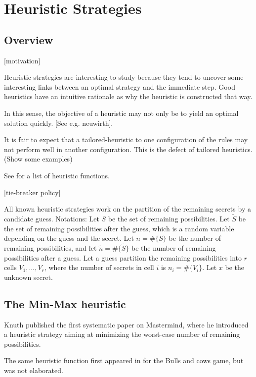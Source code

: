 \chapter{Heuristic Strategies}

\section{Overview}

[motivation]

Heuristic strategies are interesting to study because they tend to uncover some interesting links between an optimal strategy and the immediate step. Good heuristics have an intuitive rationale as why the heuristic is constructed that way.

In this sense, the objective of a heuristic may not only be to yield an optimal solution quickly. [See e.g. neuwirth].

It is fair to expect that a tailored-heuristic to one configuration of the rules may not perform well in another configuration. This is the defect of tailored heuristics. (Show some examples)

See \cite{pepperdine10} for a list of heuristic functions.

[tie-breaker policy]

All known heuristic strategies work on the partition of the remaining secrets by a candidate guess. Notations: Let $S$ be the set of remaining possibilities. Let $\tilde{S}$ be the set of remaining possibilities after the guess, which is a random variable depending on the guess and the secret. Let $n = \#\{S\}$ be the number of remaining possibilities, and let $\tilde{n} = \#\{\tilde{S}\}$ be the number of remaining possibilities after a guess. Let a guess partition the remaining possibilities into $r$ cells $V_1, \ldots, V_r$, where the number of secrets in cell $i$ is $n_i = \#\{V_i\}$. Let $x$ be the unknown secret.



\section{The Min-Max heuristic}

Knuth \cite{knuth76} published the first systematic paper on Mastermind, where he introduced a heuristic strategy aiming at minimizing the worst-case number of remaining possibilities.

The same heuristic function first appeared in \cite{aleph71} for the Bulls and cows game, but was not elaborated.

